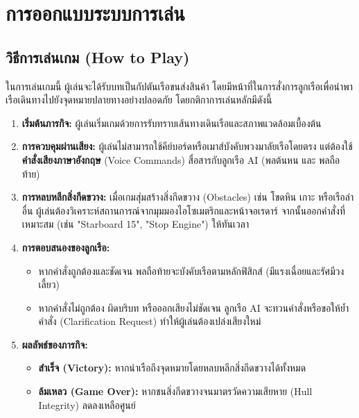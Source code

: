 \section{การออกแบบระบบการเล่น}

\subsection{วิธีการเล่นเกม (How to Play)}

ในการเล่นเกมนี้ ผู้เล่นจะได้รับบทเป็นกัปตันเรือขนส่งสินค้า โดยมีหน้าที่ในการสั่งการลูกเรือเพื่อนำพาเรือเดินทางไปยังจุดหมายปลายทางอย่างปลอดภัย โดยกติกาการเล่นหลักมีดังนี้

\begin{enumerate}[label=\arabic*)]
    \item \textbf{เริ่มต้นภารกิจ:} ผู้เล่นเริ่มเกมด้วยการรับทราบเส้นทางเดินเรือและสภาพแวดล้อมเบื้องต้น
    \item \textbf{การควบคุมผ่านเสียง:} ผู้เล่นไม่สามารถใช้คีย์บอร์ดหรือเมาส์บังคับพวงมาลัยเรือโดยตรง แต่ต้องใช้ \textbf{คำสั่งเสียงภาษาอังกฤษ} (Voice Commands) สื่อสารกับลูกเรือ AI (พลต้นหน และ พลถือท้าย)
    \item \textbf{การหลบหลีกสิ่งกีดขวาง:} เมื่อเกมสุ่มสร้างสิ่งกีดขวาง (Obstacles) เช่น โขดหิน เกาะ หรือเรือลำอื่น ผู้เล่นต้องวิเคราะห์สถานการณ์จากมุมมองไอโซเมตริกและหน้าจอเรดาร์ จากนั้นออกคำสั่งที่เหมาะสม (เช่น "Starboard 15", "Stop Engine") ให้ทันเวลา
    \item \textbf{การตอบสนองของลูกเรือ:} 
    \begin{itemize}
        \item หากคำสั่งถูกต้องและชัดเจน พลถือท้ายจะบังคับเรือตามหลักฟิสิกส์ (มีแรงเฉื่อยและรัศมีวงเลี้ยว)
        \item หากคำสั่งไม่ถูกต้อง ผิดบริบท หรือออกเสียงไม่ชัดเจน ลูกเรือ AI จะทวนคำสั่งหรือขอให้ย้ำคำสั่ง (Clarification Request) ทำให้ผู้เล่นต้องเปล่งเสียงใหม่
    \end{itemize}
    \item \textbf{ผลลัพธ์ของภารกิจ:} 
    \begin{itemize}
        \item \textbf{สำเร็จ (Victory):} หากนำเรือถึงจุดหมายโดยหลบหลีกสิ่งกีดขวางได้ทั้งหมด
        \item \textbf{ล้มเหลว (Game Over):} หากชนสิ่งกีดขวางจนมาตรวัดความเสียหาย (Hull Integrity) ลดลงเหลือศูนย์
    \end{itemize}
\end{enumerate}


